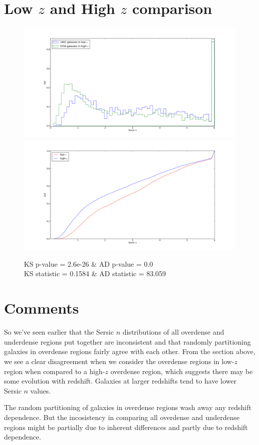 \documentclass[a4paper,10pt]{article}
\begin{document}
\section{Low $z$ and High $z$ comparison}
\begin{figure}[ht]
 \centering
  \includegraphics[scale=0.3]{hist_sersicn_LowHighZ.png}
  \includegraphics[scale=0.3]{cdf_sersicn_LowHighZ.png}
  \caption{KS p-value = 2.6e-26 \& AD p-value = 0.0 \\ KS statistic = 0.1584 \& AD statistic = 83.059}
\end{figure}

\section{Comments}
So we've seen earlier that the Sersic $n$ distributions of all overdense and underdense regions put together are inconsistent and that
randomly partitioning galaxies in overdense regions fairly agree with each other. From the section above, we see a clear disagreement when 
we consider the overdense regions in low-$z$ region when compared to a high-$z$ overdense region, which suggests there may be some
evolution with redshift. Galaxies at larger redshifts tend to have lower Sersic $n$ values. 

The random partitioning of galaxies in overdense regions wash away any redshift dependence. But the incosistency in comparing
all overdense and underdense regions might be partially due to inherent differences and partly due to redshift dependence.
\end{document}
